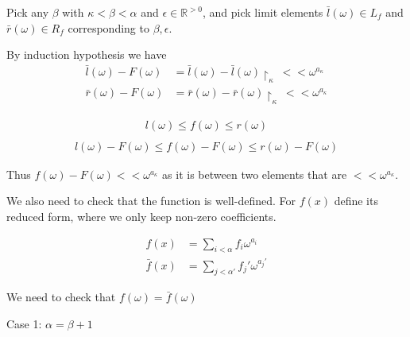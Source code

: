 \documentclass{article}
\newcommand{\R}{\mathbb{R}}
\newcommand{\w}{\omega}
\newcommand{\midr}[1]{\restriction_{#1}}
\begin{document}
Pick any $\beta$ with $\kappa < \beta < \alpha$ and $\epsilon \in \R^{>0}$,
and pick limit elements $\bar l(\w) \in L_f$ and $\bar r(\w) \in R_f$ corresponding to $\beta, \epsilon$.

By induction hypothesis we have 
\begin{align*}
	\bar l(\w) - F(\w) &= \bar l(\w) - \bar l(\w)\midr\kappa \ <<  \w^{a_\kappa} \\
	\bar r(\w) - F(\w) &= \bar r(\w) - \bar r(\w)\midr\kappa \ <<  \w^{a_\kappa}
\end{align*}

\begin{align*}
	l(\w) \leq f(\w) \leq r(\w) \\
\end{align*}
\begin{align*}
	l(\w) - F(\w) \leq f(\w) - F(\w) \leq r(\w) - F(\w)
\end{align*}
 
Thus $f(\w) - F(\w) << \w^{a_\kappa}$ as it is between two elements that are $<<  \w^{a_\kappa}$.

We also need to check that the function is well-defined. For $f(x)$ define its reduced form, where we only keep non-zero coefficients.

\begin{align*}
	f(x) &= \sum_{i < \alpha} f_i \w^{a_i} \\
	\bar f(x) &= \sum_{j < \alpha'} f_j' \w^{a_j'}
\end{align*}

We need to check that $f(\w) = \bar f(\w)$

Case 1: $\alpha = \beta + 1$
\end{document}
